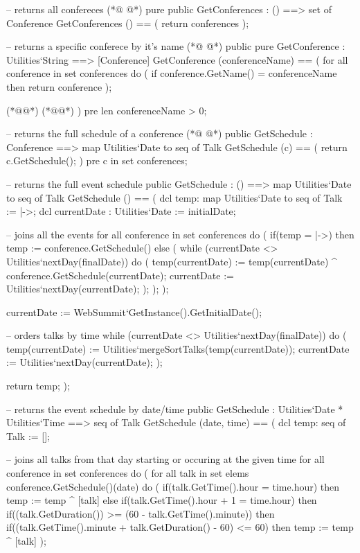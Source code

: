 \begin{vdmpp}[breaklines=true]
  -- returns all confereces
(*@
\label{GetConferences:125}
@*)
  pure public GetConferences : () ==> set of Conference
    GetConferences () == (
     return conferences
    );
    
  -- returns a specific conferece by it's name
(*@
\label{GetConference:131}
@*)
  public pure GetConference : Utilities`String ==> [Conference]
    GetConference (conferenceName) == (
     for all conference in set conferences do (
      if conference.GetName() = conferenceName
      then return conference
     );
     
     (*@@*) (*@@*)
    )
  pre len conferenceName > 0;
  
  -- returns the full schedule of a conference
(*@
\label{GetSchedule:143}
@*)
  public GetSchedule : Conference ==> map Utilities`Date to seq of Talk
    GetSchedule (c) == (
     return c.GetSchedule();
    )
    pre c in set conferences;
    
  -- returns the full event schedule
  public GetSchedule : () ==> map Utilities`Date to seq of Talk
    GetSchedule () == (
     dcl temp: map Utilities`Date to seq of Talk := {|->};
     dcl currentDate : Utilities`Date := initialDate;
     
     -- joins all the events
     for all conference in set conferences do (
      if(temp = {|->})
       then temp := conference.GetSchedule()
       else 
       (
        while (currentDate <> Utilities`nextDay(finalDate))
          do (
             temp(currentDate) := temp(currentDate) ^ conference.GetSchedule(currentDate);
            currentDate := Utilities`nextDay(currentDate);
            );
       );
     );
     
     currentDate := WebSummit`GetInstance().GetInitialDate();
     
     -- orders talks by time
     while (currentDate <> Utilities`nextDay(finalDate))
     do (
      temp(currentDate) := Utilities`mergeSortTalks(temp(currentDate));
      currentDate := Utilities`nextDay(currentDate);
    );
          
     return temp;
    );   
    
  -- returns the event schedule by date/time
  public GetSchedule : Utilities`Date * Utilities`Time ==> seq of Talk
    GetSchedule (date, time) == (
     dcl temp: seq of Talk := [];
     
     -- joins all talks from that day starting or occuring at the given time
     for all conference in set conferences do (
      for all talk in set elems conference.GetSchedule()(date) do
      (
       if(talk.GetTime().hour = time.hour)
       then temp := temp ^ [talk]
       else
        if(talk.GetTime().hour + 1 = time.hour)
        then if((talk.GetDuration()) >= (60 - talk.GetTime().minute))
         then if((talk.GetTime().minute + talk.GetDuration() - 60) <= 60)
          then temp := temp ^ [talk]
      );
      

\end{vdmpp}
